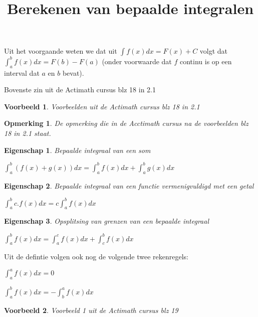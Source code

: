 \documentclass{article}
\title{Berekenen van bepaalde integralen}
\date { }
\newtheorem*{voorbeeld}{Voorbeeld} \newtheorem*{eigenschap}{Eigenschap} \newtheorem*{opmerking}{Opmerking}
\begin{document}
\maketitle \noindent

\noindent Uit het voorgaande weten we dat uit $\int f(x)dx=F(x)+C$ volgt dat $\int^b_a f(x)dx=F(b)-F(a)$ (onder voorwaarde dat $f$ continu is op een interval dat $a$ en $b$ bevat).

\noindent Bovenste zin uit de Actimath cursus blz 18 in 2.1

\begin{voorbeeld}
Voorbeelden uit de Actimath cursus blz 18 in 2.1
\end{voorbeeld}

\begin{opmerking}
De opmerking die in de Acctimath cursus na de voorbeelden blz 18 in 2.1 staat.
\end{opmerking}

\begin{eigenschap} Bepaalde integraal van een som

$\boxed { \int^b_a (f(x)+g(x))dx = \int^b_a f(x)dx + \int^b_a g(x)dx }$
\end{eigenschap}

\begin{eigenschap} Bepaalde integraal van een functie vermenigvuldigd met een getal

$\boxed { \int^b_a c.f(x)dx = c \int^b_a f(x)dx}$
\end{eigenschap}

\begin{eigenschap} Opsplitsing van grenzen van een bepaalde integraal

$\boxed { \int^b_a f(x) dx = \int^c_a f(x)dx + \int^b_c f(x)dx }$
\end{eigenschap}

\noindent Uit de defintie volgen ook nog de volgende twee rekenregels:

$\boxed { \int^a_a f(x) dx = 0}$

$\boxed { \int^b_a f(x) dx = - \int^a_b f(x) dx }$

\begin{voorbeeld}
Voorbeeld 1 uit de Actimath cursus blz 19
\end{voorbeeld}
\end{document}
